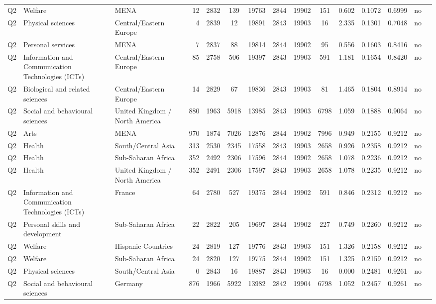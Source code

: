 \begin{longtable}{lllrcccccccccll}
Q2 & Welfare & MENA & 12 & 2832 & 139 & 19763 & 2844 & 19902 & 151 & 0.602 & 0.1072 & 0.6999 & no \\
Q2 & Physical sciences & Central/Eastern Europe & 4 & 2839 & 12 & 19891 & 2843 & 19903 & 16 & 2.335 & 0.1301 & 0.7048 & no \\
Q2 & Personal services & MENA & 7 & 2837 & 88 & 19814 & 2844 & 19902 & 95 & 0.556 & 0.1603 & 0.8416 & no \\
Q2 & Information and Communication Technologies (ICTs) & Central/Eastern Europe & 85 & 2758 & 506 & 19397 & 2843 & 19903 & 591 & 1.181 & 0.1654 & 0.8420 & no \\
Q2 & Biological and related sciences & Central/Eastern Europe & 14 & 2829 & 67 & 19836 & 2843 & 19903 & 81 & 1.465 & 0.1804 & 0.8914 & no \\
Q2 & Social and behavioural sciences & United Kingdom / North America & 880 & 1963 & 5918 & 13985 & 2843 & 19903 & 6798 & 1.059 & 0.1888 & 0.9064 & no \\
Q2 & Arts & MENA & 970 & 1874 & 7026 & 12876 & 2844 & 19902 & 7996 & 0.949 & 0.2155 & 0.9212 & no \\
Q2 & Health & South/Central Asia & 313 & 2530 & 2345 & 17558 & 2843 & 19903 & 2658 & 0.926 & 0.2358 & 0.9212 & no \\
Q2 & Health & Sub-Saharan Africa & 352 & 2492 & 2306 & 17596 & 2844 & 19902 & 2658 & 1.078 & 0.2236 & 0.9212 & no \\
Q2 & Health & United Kingdom / North America & 352 & 2491 & 2306 & 17597 & 2843 & 19903 & 2658 & 1.078 & 0.2235 & 0.9212 & no \\
Q2 & Information and Communication Technologies (ICTs) & France & 64 & 2780 & 527 & 19375 & 2844 & 19902 & 591 & 0.846 & 0.2312 & 0.9212 & no \\
Q2 & Personal skills and development & Sub-Saharan Africa & 22 & 2822 & 205 & 19697 & 2844 & 19902 & 227 & 0.749 & 0.2260 & 0.9212 & no \\
Q2 & Welfare & Hispanic Countries & 24 & 2819 & 127 & 19776 & 2843 & 19903 & 151 & 1.326 & 0.2158 & 0.9212 & no \\
Q2 & Welfare & Sub-Saharan Africa & 24 & 2820 & 127 & 19775 & 2844 & 19902 & 151 & 1.325 & 0.2159 & 0.9212 & no \\
Q2 & Physical sciences & South/Central Asia & 0 & 2843 & 16 & 19887 & 2843 & 19903 & 16 & 0.000 & 0.2481 & 0.9261 & no \\
Q2 & Social and behavioural sciences & Germany & 876 & 1966 & 5922 & 13982 & 2842 & 19904 & 6798 & 1.052 & 0.2457 & 0.9261 & no \\

\end{longtable}
